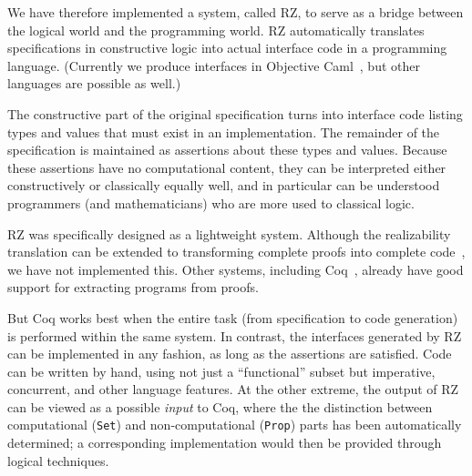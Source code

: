 We have therefore implemented a system, called RZ, to serve as a bridge between
the logical world and the programming world. RZ automatically translates
specifications in constructive logic into actual interface code in a
programming language. (Currently we produce interfaces in 
Objective Caml~\cite{ocaml}, but other languages are possible
as well.)

The constructive part of the original specification turns into interface code
listing types and values that must exist in an implementation. The remainder of
the specification is maintained as assertions about these types and values.
Because these assertions have no computational content, they can be interpreted
either constructively or classically equally well, and in particular can
be understood programmers (and mathematicians) who are more used to
classical logic.

\bigskip

RZ was specifically designed as a lightweight system. Although the
realizability translation can be extended to transforming complete
proofs into complete code~\cite{komagata+:tr95}, we have not
implemented this. Other systems, including Coq~\cite{coqart}, already
have good support for extracting programs from proofs.

But Coq works best when the entire task (from specification to code
generation) is performed within the same system.  In contrast, the
interfaces generated by RZ can be implemented in any fashion, as long
as the assertions are satisfied. Code can be written by hand, using
not just a ``functional'' subset but imperative,
concurrent, and other language features.  At the other extreme, the output
of RZ can be viewed as a possible \emph{input} to Coq, where the
the distinction
between computational (\texttt{Set}) and non-computational (\texttt{Prop}) parts
has been automatically determined;
a corresponding implementation would then be
provided through logical techniques.



